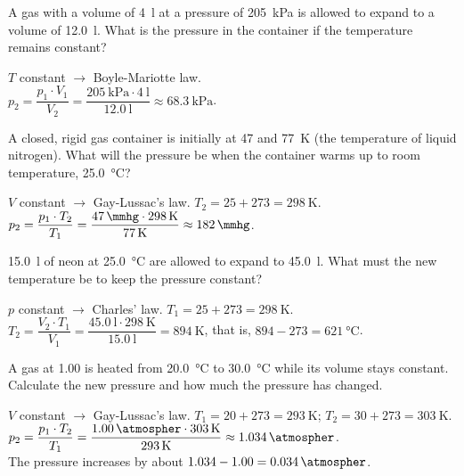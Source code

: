 \begin{exercise}
    A gas with a volume of \qty{4}{\litre} at a pressure of \qty{205}{\kilo\pascal} is allowed to expand to a volume of \qty{12.0}{\litre}. What is the pressure in the container if the temperature remains constant?
    \begin{solu}
        \(T\) constant \(\to\) Boyle-Mariotte law. \\
        \(p_2 = \dfrac{p_1 \cdot V_1}{V_2} = \dfrac{\qty{205}{\kilo\pascal} \cdot \qty{4}{\litre}}{\qty{12.0}{\litre}} \approx \qty{68.3}{\kilo\pascal}\).
    \end{solu}
\end{exercise}

\begin{exercise}
    A closed, rigid gas container is initially at \qty{47}{\mmhg} and \qty{77}{\kelvin} (the temperature of liquid nitrogen). What will the pressure be when the container warms up to room temperature, \qty{25.0}{\celsius}?
    \begin{solu}
        \(V\) constant \(\to\) Gay-Lussac's law. \(T_2 = 25 + 273 = \qty{298}{\kelvin}\). \\
        \(p_2 = \dfrac{p_1 \cdot T_2}{T_1} = \dfrac{\qty{47}{\mmhg} \cdot \qty{298}{\kelvin}}{\qty{77}{\kelvin}} \approx \qty{182}{\mmhg}\).
    \end{solu}
\end{exercise}

\begin{exercise}
    \qty{15.0}{\litre} of neon at \qty{25.0}{\celsius} are allowed to expand to \qty{45.0}{\litre}. What must the new temperature be to keep the pressure constant?
    \begin{solu}
        \(p\) constant \(\to\) Charles' law. \(T_1 = 25 + 273 = \qty{298}{\kelvin}\). \\
        \(T_2 = \dfrac{V_2 \cdot T_1}{V_1} = \dfrac{\qty{45.0}{\litre} \cdot \qty{298}{\kelvin}}{\qty{15.0}{\litre}} = \qty{894}{\kelvin}\), that is, \(894 - 273 = \qty{621}{\celsius}\).
    \end{solu}
\end{exercise}

\begin{exercise}
    A gas at \qty{1.00}{\atmospher} is heated from \qty{20.0}{\celsius} to \qty{30.0}{\celsius} while its volume stays constant. Calculate the new pressure and how much the pressure has changed.
    \begin{solu}
        \(V\) constant \(\to\) Gay-Lussac's law. \(T_1 = 20 + 273 = \qty{293}{\kelvin}\); \(T_2 = 30 + 273 = \qty{303}{\kelvin}\). \\
        \(p_2 = \dfrac{p_1 \cdot T_2}{T_1} = \dfrac{\qty{1.00}{\atmospher} \cdot \qty{303}{\kelvin}}{\qty{293}{\kelvin}} \approx \qty{1.034}{\atmospher}\). \\
        The pressure increases by about \(\num{1.034} - \num{1.00} = \qty{0.034}{\atmospher}\).
    \end{solu}
\end{exercise}

